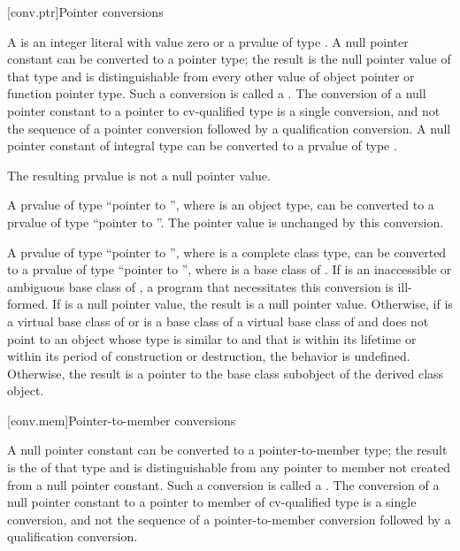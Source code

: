 [conv.ptr]{Pointer conversions}

\pnum
{}%
%
%
%
A  is an integer literal with
value zero
or a prvalue of type . A null pointer constant can be
converted to a pointer type; the
result is the null pointer value of that type and is
distinguishable from every other value of
object pointer or function pointer
type.
Such a conversion is called a .
The conversion of a null pointer constant to a pointer to
cv-qualified type is a single conversion, and not the sequence of a
pointer conversion followed by a qualification
conversion. A null pointer constant of integral type
can be converted to a prvalue of type .
\begin{note}
The resulting prvalue is not a null pointer value.
\end{note}

\pnum
A prvalue of type ``pointer to \cv{} '', where 
is an object type, can be converted to a prvalue of type ``pointer to
\cv{} ''.
The pointer value is unchanged by this conversion.

\pnum
A prvalue  of type ``pointer to \cv{} '', where 
is a complete class type, can be converted to a prvalue of type ``pointer to
\cv{} '', where  is a base class
of . If  is an
inaccessible or
ambiguous base class of , a program
that necessitates this conversion is ill-formed.
If  is a null pointer value,
the result is a null pointer value.
Otherwise,
if  is a virtual base class of 
or is a base class of a virtual base class of  and
 does not point to an object
whose type is similar to  and
that is
within its lifetime or
within its period of construction or destruction,
the behavior is undefined.
Otherwise,
the result is a pointer to the base class subobject of
the derived class object.

[conv.mem]{Pointer-to-member conversions}

\pnum
{}%
%
%
A null pointer constant can be converted to a
pointer-to-member
type; the result is the 
of that type and is distinguishable from any pointer to member not
created from a null pointer constant.
Such a conversion is called a .
The conversion of a null pointer
constant to a pointer to member of cv-qualified type is a single
conversion, and not the sequence of a pointer-to-member conversion
followed by a qualification conversion.

